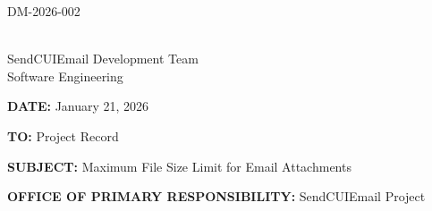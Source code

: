 \documentclass[11pt,letterpaper]{article}
\newcommand{\UniqueID}{DM-2026-002}
\newcommand{\DocumentDate}{January 21, 2026}
\newcommand{\AuthorName}{SendCUIEmail Development Team}
\newcommand{\AuthorTitle}{Software Engineering}
\newcommand{\ToField}{Project Record}
\newcommand{\SubjectField}{Maximum File Size Limit for Email Attachments}
\newcommand{\OPRField}{SendCUIEmail Project}
\begin{document}
\hfill \UniqueID

\vspace{0.25in}

\underline{\hspace{2.5in}}\\[2pt]
\AuthorName\\
\AuthorTitle

\vspace{0.25in}

\textbf{DATE:} \DocumentDate

\textbf{TO:} \ToField

\textbf{SUBJECT:} \SubjectField

\textbf{OFFICE OF PRIMARY RESPONSIBILITY:} \OPRField

\vspace{0.25in}
\end{document}
